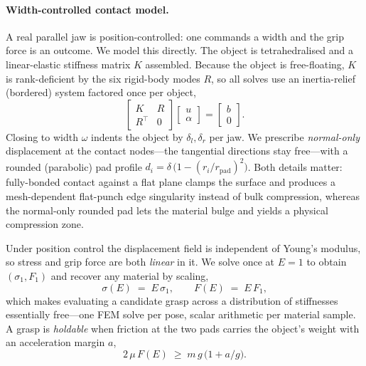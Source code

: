 \documentclass[letterpaper, 10 pt, conference]{ieeeconf}  %
\begin{document}
\paragraph{Width-controlled contact model.}
A real parallel jaw is position-controlled: one commands a width and the grip force is an
outcome. We model this directly. The object is tetrahedralised and a linear-elastic
stiffness matrix $K$ assembled. Because the object is free-floating, $K$ is rank-deficient
by the six rigid-body modes $R$, so all solves use an inertia-relief (bordered) system
factored once per object,
\begin{equation}
  \begin{bmatrix} K & R \\ R^{\!\top} & 0 \end{bmatrix}
  \begin{bmatrix} u \\ \alpha \end{bmatrix}
  =\begin{bmatrix} b \\ 0 \end{bmatrix}.
  \label{eq:inertia-relief}
\end{equation}
Closing to width $\omega$ indents the object by $\delta_{l},\delta_{r}$ per jaw. We prescribe
\emph{normal-only} displacement at the contact nodes---the tangential directions stay
free---with a rounded (parabolic) pad profile $d_i=\delta\,\bigl(1-(r_i/r_{\text{pad}})^2\bigr)$.
Both details matter: fully-bonded contact against a flat plane clamps the surface and
produces a mesh-dependent flat-punch edge singularity instead of bulk compression, whereas
the normal-only rounded pad lets the material bulge and yields a physical compression zone.

Under position control the displacement field is independent of Young's modulus, so stress
and grip force are both \emph{linear} in it. We solve once at $E\!=\!1$ to obtain
$(\sigma_1, F_1)$ and recover any material by scaling,
\begin{equation}
  \sigma(E) \;=\; E\,\sigma_1, \qquad F(E) \;=\; E\,F_1 ,
  \label{eq:E-linear}
\end{equation}
which makes evaluating a candidate grasp across a distribution of stiffnesses essentially
free---one FEM solve per pose, scalar arithmetic per material sample. A grasp is
\emph{holdable} when friction at the two pads carries the object's weight with an
acceleration margin $a$,
\begin{equation}
  2\,\mu\,F(E) \;\ge\; m\,g\,\bigl(1 + a/g\bigr).
  \label{eq:hold}
\end{equation}
\end{document}
